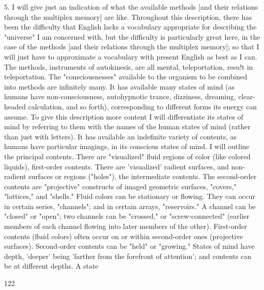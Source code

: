 \documentclass[10pt,twoside]{memoir}
\begin{document}
\begin{enumerate}
{\begin{enumerate}
\begin{sysrules}
\begin{sysrules}
\begin{sysrules}
\begin{sysrules}
{\begin{enumerate}
5. I will give just an indication of what the available methods [and 
their relations through the multiplex memory] are like. Throughout this 
description, there has been the difficulty that English lacks a vocabulary 
appropriate for describing the "universe" I am concerned with, but the 
difficulty is particularly great here, in the case of the methods [and their 
relations through the multiplex memory]; so that I will just have to 
approximate a vocabulary with present English as best as I can. The 
methods, instruments of autokinesis, are all mental, teleportation, resu!t in 
teleportation. The "consciousnesses" available to the organism to be 
combined into methods are infinitely many. It has available many states of 
mind (as humans have non-consciousness, autohypnotic trance, dizziness, 
dreaming, clear-headed calculation, and so forth), corresponding to different 
forms its energy can assume. To give this description more content I will 
differentiate its states of mind by referring to them with the names of the 
human states of mind (rather than just with letters). It has available an 
indefinite variety of contents, as humans have particular imagings, in its 
conscious states of mind. I will outline the principal contents. There are 
"visualized" fluid regions of color (like colored liquids), first-order contents. 
There are 'visualized' radient surfaces, and non-radient surfaces or regions 
("holes"), the intermediate contents. The second-order contents are 
"projective" constructs of imaged geometric surfaces, "covers," "lattices," 
and "shells." Fluid colors can be stationary or flowing. They can occur in 
certain series, "channels"; and in certain arrays, "reservoirs." A channel can 
be "closed" or "open"; two channels can be "crossed," or 
"screw-connected" (earlier members of each channel flowing into later 
members of the other). First-order contents (fluid colors) often occur on or 
within second-order ones (projective surfaces). Second-order contents can be 
"held" or "growing." States of mind have depth, 'deeper' being 'farther from 
the forefront of attention'; and contents can be at different depths. A state 


122 



\end{enumerate}}
\end{sysrules}
\end{sysrules}
\end{sysrules}
\end{sysrules}
\end{enumerate}}
\end{enumerate}
\end{document}
